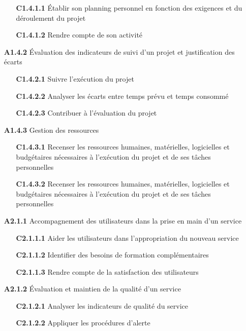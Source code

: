 \documentclass[12pt,a4paper,oneside,titlepage,final]{article}
\begin{document}
\begin{enumerate}
  \begin{itemize}
    \item [\textbf{C1.4.1.1}] Établir son planning personnel en
    fonction des exigences et du déroulement du projet
    \item [\textbf{C1.4.1.2}] Rendre compte de son activité
  \end{itemize}
  \item [\textbf{A1.4.2}] Évaluation des indicateurs de suivi d'un
  projet et justification des écarts
  \begin{itemize}
    \item [\textbf{C1.4.2.1}] Suivre l'exécution du projet
    \item [\textbf{C1.4.2.2}] Analyser les écarts entre temps prévu et
    temps consommé
    \item [\textbf{C1.4.2.3}] Contribuer à l'évaluation du projet
  \end{itemize}
  \item [\textbf{A1.4.3}] Gestion des ressources
  \begin{itemize}
    \item [\textbf{C1.4.3.1}] Recenser les ressources humaines,
    matérielles, logicielles et budgétaires nécessaires à l'exécution
    du projet et de ses tâches personnelles
    \item [\textbf{C1.4.3.2}] Recenser les ressources humaines,
    matérielles, logicielles et budgétaires nécessaires à l'exécution
    du projet et de ses tâches personnelles
  \end{itemize}
  \item [\textbf{A2.1.1}] Accompagnement des utilisateurs dans la
  prise en main d'un service
  \begin{itemize}
    \item [\textbf{C2.1.1.1}] Aider les utilisateurs dans
    l'appropriation du nouveau service
    \item [\textbf{C2.1.1.2}] Identifier des besoins de formation
    complémentaires
    \item [\textbf{C2.1.1.3}] Rendre compte de la satisfaction des
    utilisateurs
  \end{itemize}
  \item [\textbf{A2.1.2}] Évaluation et maintien de la qualité d'un
  service
  \begin{itemize}
    \item [\textbf{C2.1.2.1}] Analyser les indicateurs de
    qualité du service
    \item [\textbf{C2.1.2.2}] Appliquer les procédures d'alerte

\end{itemize}
\end{enumerate}
\end{document}
